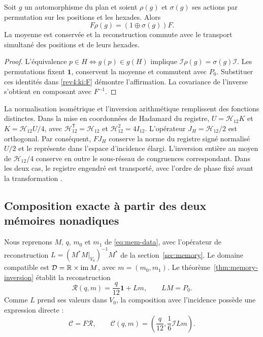 \begin{proposition}
\label{rev4:ki:equivariance}
Soit \(g\) un automorphisme du plan et soient \(\rho(g)\) et
\(\sigma(g)\) ses actions par permutation sur les positions et les
hexades. Alors
\[
 F\rho(g)=(1\oplus\sigma(g))F.
\]
La moyenne est conservée et la reconstruction commute avec le transport simultané des positions et de leurs hexades.
\end{proposition}
\begin{proof}
L’équivalence \(p\in H\Longleftrightarrow g(p)\in g(H)\)
implique \(\mathcal I\rho(g)=\sigma(g)\mathcal I\).
Les permutations fixent \(\mathbf1\), conservent la moyenne et
commutent avec \(P_0\). Substituer ces identités dans
\eqref{rev4:ki:F} démontre l’affirmation. La covariance de
l’inverse s’obtient en composant avec \(F^{-1}\).
\end{proof}

La normalisation isométrique et l'inversion arithmétique remplissent des fonctions distinctes. Dans la mise en coordonnées de Hadamard du registre, \(U=\mathcal H_{12}K\) et \(K=\mathcal H_{12}U/4\), avec \(\mathcal H_{12}^{\mathsf T}=\mathcal H_{12}\) et \(\mathcal H_{12}^2=4I_{12}\). L'opérateur \(J_H=\mathcal H_{12}/2\) est orthogonal. Par conséquent, \(FJ_H\) conserve la norme du registre signé normalisé \(U/2\) et le représente dans l'espace d'incidence élargi. L'inversion entière au moyen de \(\mathcal H_{12}/4\) conserve en outre le sous-réseau de congruences correspondant. Dans les deux cas, le registre engendré est transporté, avec l'ordre de phase fixé avant la transformation \cite{hmtX}.

\subsection{Composition exacte à partir des deux mémoires nonadiques}
\label{rev4:ki:memory-subsection}

Nous reprenons \(M\), \(q\), \(m_0\) et \(m_1\)
de \eqref{eq:mem-data}, avec l’opérateur de reconstruction
\(L=(M^*M|_{V_0})^{-1}M^*\) de la section~\ref{sec:memory}.
Le domaine compatible est
\(\mathcal D=\mathbb R\times\operatorname{im}M\), avec
\(m=(m_0,m_1)\). Le théorème~\ref{thm:memory-inversion}
établit la reconstruction
\[
 \mathcal R(q,m)=\frac q{12}\mathbf1+Lm,
 \qquad LM=P_0.
\]
Comme \(L\) prend ses valeurs dans \(V_0\), la composition avec
l’incidence possède une expression directe :
\begin{equation}
 \mathcal C=F\mathcal R,\qquad
 \mathcal C(q,m)=\left(\frac q{12},\frac16\mathcal I Lm\right).
 \label{rev4:ki:memory-incidence}
\end{equation}

